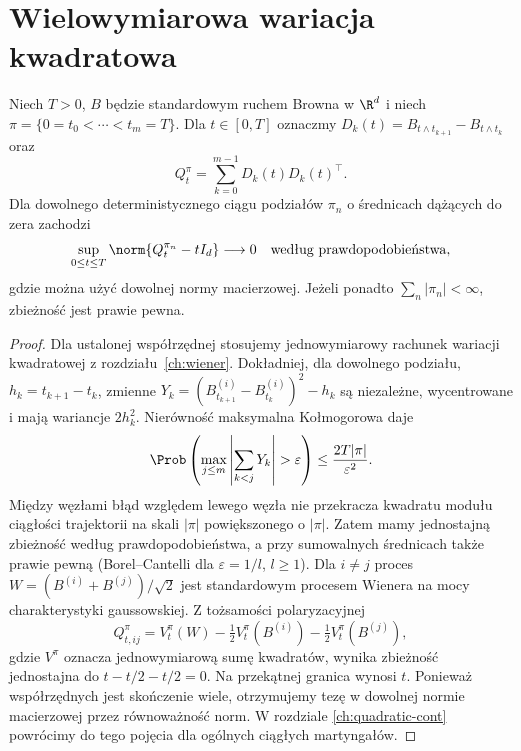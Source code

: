 \section{Wielowymiarowa wariacja kwadratowa}
\begin{twierdzenie}
\label{thm:brown-multi-bracket}
Niech $T>0$, $B$ będzie standardowym ruchem Browna
w $\R^d$ i niech $\pi=\{0=t_0<\cdots<t_m=T\}$.
Dla $t\in[0,T]$ oznaczmy
$D_k(t)=B_{t\wedge t_{k+1}}-B_{t\wedge t_k}$ oraz
\[
Q^\pi_t=\sum_{k=0}^{m-1}D_k(t)D_k(t)^\top.
\]
Dla dowolnego deterministycznego ciągu podziałów
$\pi_n$ o średnicach dążących do zera zachodzi
\[
\sup_{0\le t\le T}\norm{Q^{\pi_n}_t-tI_d}
\longrightarrow0
\quad\text{według prawdopodobieństwa},
\]
gdzie można użyć dowolnej normy macierzowej.
Jeżeli ponadto $\sum_n|\pi_n|<\infty$, zbieżność
jest prawie pewna.
\end{twierdzenie}
\begin{proof}
Dla ustalonej współrzędnej stosujemy jednowymiarowy
rachunek wariacji kwadratowej z rozdziału~\ref{ch:wiener}.
Dokładniej, dla dowolnego podziału, $h_k=t_{k+1}-t_k$,
zmienne $Y_k=(B^{(i)}_{t_{k+1}}-B^{(i)}_{t_k})^2-h_k$
są niezależne, wycentrowane i mają wariancje $2h_k^2$.
Nierówność maksymalna Kołmogorowa daje
\[
\Prob\left(\max_{j\le m}\left|\sum_{k<j}Y_k\right|
>\varepsilon\right)
\le \frac{2T|\pi|}{\varepsilon^2}.
\]
Między węzłami błąd względem lewego węzła
nie przekracza kwadratu modułu ciągłości trajektorii
na skali $|\pi|$ powiększonego o $|\pi|$.
Zatem mamy jednostajną zbieżność według
prawdopodobieństwa, a przy sumowalnych średnicach
także prawie pewną (Borel--Cantelli dla
$\varepsilon=1/l$, $l\ge1$).
Dla $i\ne j$ proces
$W=(B^{(i)}+B^{(j)})/\sqrt2$ jest standardowym
procesem Wienera na mocy charakterystyki gaussowskiej.
Z tożsamości polaryzacyjnej
\[
Q^\pi_{t,ij}
=V_t^\pi(W)-\tfrac12V_t^\pi(B^{(i)})
-\tfrac12V_t^\pi(B^{(j)}),
\]
gdzie $V^\pi$ oznacza jednowymiarową sumę kwadratów,
wynika zbieżność jednostajna do $t-t/2-t/2=0$.
Na przekątnej granica wynosi $t$.
Ponieważ współrzędnych jest skończenie wiele,
otrzymujemy tezę w dowolnej normie macierzowej
przez równoważność norm. W rozdziale
\ref{ch:quadratic-cont} powrócimy do tego pojęcia
dla ogólnych ciągłych martyngałów.
\end{proof}

